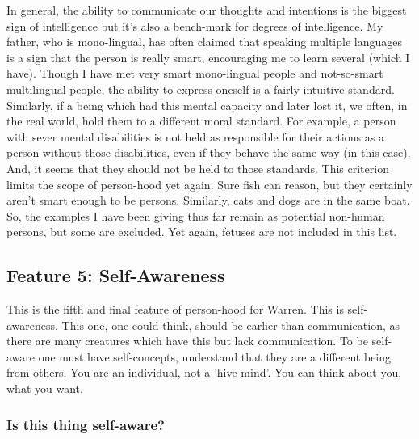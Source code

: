 In general, the ability to communicate our thoughts and intentions is the biggest sign of intelligence but it's also a bench-mark for degrees of intelligence. My father, who is mono-lingual, has often claimed that speaking multiple languages is a sign that the person is really smart, encouraging me to learn several (which I have). Though I have met very smart mono-lingual people and not-so-smart multilingual people, the ability to express oneself is a fairly intuitive standard. Similarly, if a being which had this mental capacity and later lost it, we often, in the real world, hold them to a different moral standard. For example, a person with sever mental disabilities is not held as responsible for their actions as a person without those disabilities, even if they behave the same way (in this case). And, it seems that they should not be held to those standards. This criterion limits the scope of person-hood yet again. Sure fish can reason, but they certainly aren't smart enough to be persons. Similarly, cats and dogs are in the same boat. So, the examples I have been giving thus far remain as potential non-human persons, but some are excluded. Yet again, fetuses are not included in this list. 
\subsection{Feature 5: Self-Awareness}

This is the fifth and final feature of person-hood for Warren. This is self-awareness. This one, one could think, should be earlier than communication, as there are many creatures which have this but lack communication. To be self-aware one must have self-concepts, understand that they are a different being from others. You are an individual, not a 'hive-mind'. You can think about you, what you want.
\subsubsection{Is this thing self-aware?}


